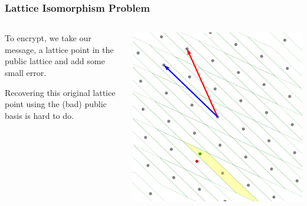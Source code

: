 \documentclass[
aspectratio=169, %
t, %
onlytextwidth, %
10pt, %
]{beamer}
\begin{document}
\begin{frame}
    \frametitle{Lattice Isomorphism Problem}
    \begin{columns}[T]
        \begin{column}{0.48\linewidth}
            To encrypt, we take our message, a lattice point in the public lattice and add some small error.
            
            Recovering this original lattice point using the (bad) public basis is hard to do.
        \end{column}
        \begin{column}{0.48\linewidth}
            \includegraphics[width=\linewidth]{LIP_bad_basis.png}
        \end{column}
    \end{columns}
\end{frame}

\end{document}
